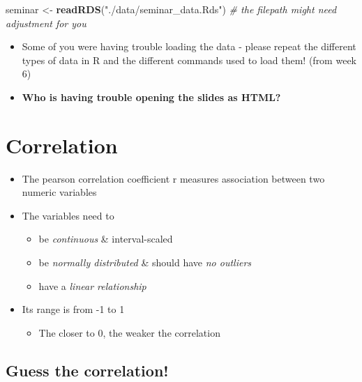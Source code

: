 \documentclass[
]{book}
\newenvironment{Shaded}{\begin{snugshade}}{\end{snugshade}}
\newcommand{\CommentTok}[1]{\textcolor[rgb]{0.56,0.35,0.01}{\textit{#1}}}
\newcommand{\FunctionTok}[1]{\textcolor[rgb]{0.13,0.29,0.53}{\textbf{#1}}}
\newcommand{\NormalTok}[1]{#1}
\newcommand{\OtherTok}[1]{\textcolor[rgb]{0.56,0.35,0.01}{#1}}
\newcommand{\StringTok}[1]{\textcolor[rgb]{0.31,0.60,0.02}{#1}}
\providecommand{\tightlist}{%
  \setlength{\itemsep}{0pt}\setlength{\parskip}{0pt}}
\begin{document}
\begin{Shaded}
\begin{Highlighting}[]
\NormalTok{seminar }\OtherTok{\textless{}{-}} \FunctionTok{readRDS}\NormalTok{(}\StringTok{"./data/seminar\_data.Rds"}\NormalTok{) }\CommentTok{\# the filepath might need adjustment for you}
\end{Highlighting}
\end{Shaded}

\begin{itemize}
\tightlist
\item
  Some of you were having trouble loading the data - please repeat the different types of data in R and the different commands used to load them! (from week 6)
\item
  \textbf{Who is having trouble opening the slides as HTML?}
\end{itemize}

\section{Correlation}\label{correlation}

\begin{itemize}
\tightlist
\item
  The pearson correlation coefficient r measures association between two numeric variables
\item
  The variables need to

  \begin{itemize}
  \tightlist
  \item
    be \emph{continuous} \& interval-scaled
  \item
    be \emph{normally distributed} \& should have \emph{no outliers}
  \item
    have a \emph{linear relationship}
  \end{itemize}
\item
  Its range is from -1 to 1

  \begin{itemize}
  \tightlist
  \item
    The closer to 0, the weaker the correlation
  \end{itemize}
\end{itemize}

\subsection{Guess the correlation!}\label{guess-the-correlation}
\end{document}
